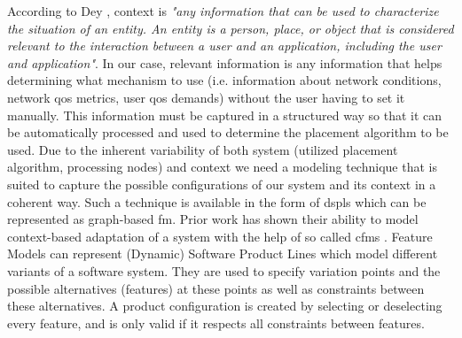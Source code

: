 According to Dey \cite{Dey2001}, context is \textit{"any information that can be used to characterize the situation of an entity. An entity is a person, place, or object that is considered relevant to the interaction between a user and an application, including the user and application"}.
In our case, relevant information is any information that helps determining what mechanism to use (i.e. information about network conditions, network \gls{qos} metrics, user \gls{qos} demands) without the user having to set it manually.
This information must be captured in a structured way so that it can be automatically processed and used to determine the placement algorithm to be used.  
Due to the inherent variability of both system (utilized placement algorithm, processing nodes) and context we need a modeling technique that is suited to capture the possible configurations of our system and its context in a coherent way. 
Such a technique is available in the form of \glspl{dspl} which can be represented as graph-based \gls{fm}. Prior work has shown their ability to model context-based adaptation of a system with the help of so called \glspl{cfm} \cite{Saller2013} \cite{Acher2009}.
Feature Models can represent (Dynamic) Software Product Lines which model different variants of a software system. They are used to specify variation points and the possible alternatives (features) at these points as well as constraints between these alternatives. A product configuration is created by 
 selecting or deselecting every feature, and is only valid if it respects all constraints between features.
 
